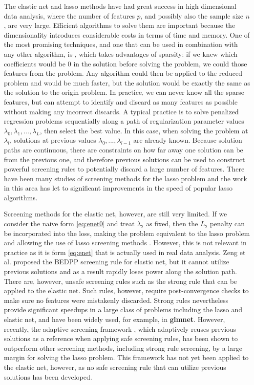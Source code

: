 The elastic net and lasso methods have had great success in high dimensional data analysis, where the number of features $p$, and possibly also the sample size $n$, are very large. Efficient algorithms to solve them are important because the dimensionality introduces considerable costs in terms of time and memory. One of the most promising techniques, and one that can be used in combination with any other algorithm, is , which takes advantages of sparsity: if we knew which coefficients would be 0 in the solution before solving the problem, we could  those features from the problem. Any algorithm could then be applied to the reduced problem and would be much faster, but the solution would be exactly the same as the solution to the origin problem. In practice, we can never know all the sparse features, but can attempt to identify and discard as many features as possible without making any incorrect discards. A typical practice is to solve penalized regression problems sequentially along a path of regularization parameter values $\lambda_0,\lambda_1,...,\lambda_L$, then select the best value. In this case, when solving the problem at $\lambda_l$, solutions at previous values $\lambda_0,...,\lambda_{l-1}$ are already known. Because solution paths are continuous, there are constraints on how far away one solution can be from the previous one, and therefore previous solutions can be used to construct powerful screening rules to potentially discard a large number of features. There have been many studies of screening methods for the lasso problem \citep{ghaoui2010safe,Tibshirani2012,wang2013lasso,fercoq2015,Zeng2021,wang2021adaptive} and the work in this area has let to significant improvements in the speed of popular lasso algorithms.

Screening methods for the elastic net, however, are still very limited. If we consider the naive form \eqref{eq:enet0} and treat $\lambda_2$ as fixed, then the $L_2$ penalty can be incorporated into the loss, making the problem equivalent to the lasso problem and allowing the use of lasso screening methods \citep{xu2019}. However, this is not relevant in practice as it is form \eqref{eq:enet} that is actually used in real data analysis. Zeng et al. \citep{Zeng2021} proposed the BEDPP screening rule for elastic net, but it cannot utilize previous solutions and as a result rapidly loses power along the solution path. There are, however, unsafe screening rules such as the strong rule \citep{Tibshirani2012} that can be applied to the elastic net. Such rules, however, require post-convergence checks to make sure no features were mistakenly discarded. Strong rules nevertheless provide significant speedups in a large class of problems including the lasso and elastic net, and have been widely used, for example, in \textbf{glmnet}. However, recently, the adaptive screening framework \citep{wang2021adaptive}, which adaptively reuses previous solutions as a reference when applying safe screening rules, has been shown to outperform other screening methods, including strong rule screening, by a large margin for solving the lasso problem. This framework has not yet been applied to the elastic net, however, as no safe screening rule that can utilize previous solutions has been developed.

